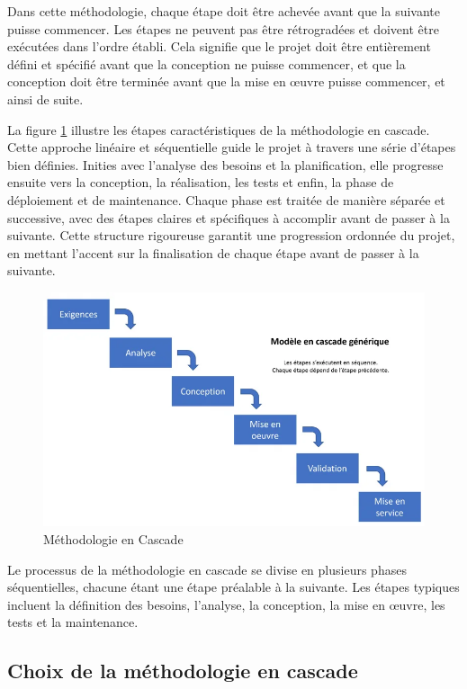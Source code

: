 Dans cette méthodologie, chaque étape doit être achevée avant que la suivante puisse commencer. Les étapes ne peuvent pas être rétrogradées et doivent être exécutées dans l'ordre établi. Cela signifie que le projet doit être entièrement défini et spécifié avant que la conception ne puisse commencer, et que la conception doit être terminée avant que la mise en œuvre puisse commencer, et ainsi de suite.


La figure \ref{Chap1.4} illustre les étapes caractéristiques de la méthodologie en cascade. Cette approche linéaire  et séquentielle guide le projet à travers une série d'étapes bien définies. Inities avec l'analyse des besoins et la planification, elle progresse ensuite vers la conception, la réalisation, les tests et enfin, la phase de déploiement et de maintenance. Chaque phase est traitée de manière séparée et successive, avec des étapes claires et spécifiques à accomplir avant de passer à la suivante. Cette structure rigoureuse garantit une progression ordonnée du projet, en mettant l'accent sur la finalisation de chaque étape avant de passer à la suivante.


\begin{figure}[H]
 \centering
    \includegraphics[width=15cm]{Images/cascade1.png}
    \caption{Méthodologie en Cascade \cite{blogcascade}}
    \label{Chap1.4}
\end{figure}

Le processus de la méthodologie en cascade se divise en plusieurs phases séquentielles, chacune étant une étape préalable à la suivante. Les étapes typiques incluent la définition des besoins, l'analyse, la conception, la mise en œuvre, les tests et la maintenance.



\subsection{Choix de la méthodologie en cascade}

